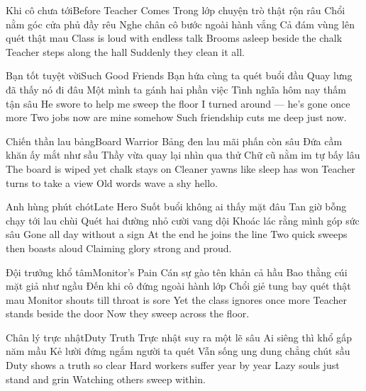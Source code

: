 \begin{tutuyetbox}{Khi cô chưa tới}{Before Teacher Comes}
Trong lớp chuyện trò thật rộn râu
Chổi nằm góc cửa phủ đầy rêu
Nghe chân cô bước ngoài hành vắng
Cả đám vùng lên quét thật mau
\tcblower
Class is loud with endless talk
Brooms asleep beside the chalk
Teacher steps along the hall
Suddenly they clean it all.
\end{tutuyetbox}

\begin{tutuyetbox}{Bạn tốt tuyệt vời}{Such Good Friends}
Bạn hứa cùng ta quét buổi đầu
Quay lưng đã thấy nó đi đâu
Một mình ta gánh hai phần việc
Tình nghĩa hôm nay thấm tận sâu
\tcblower
He swore to help me sweep the floor
I turned around — he’s gone once more
Two jobs now are mine somehow
Such friendship cuts me deep just now.
\end{tutuyetbox}

\begin{tutuyetbox}{Chiến thần lau bảng}{Board Warrior}
Bảng đen lau mãi phấn còn sâu
Đứa cầm khăn ấy mắt như sầu
Thầy vừa quay lại nhìn qua thử
Chữ cũ nằm im tự bấy lâu
\tcblower
The board is wiped yet chalk stays on
Cleaner yawns like sleep has won
Teacher turns to take a view
Old words wave a shy hello.
\end{tutuyetbox}

\begin{tutuyetbox}{Anh hùng phút chót}{Late Hero}
Suốt buổi không ai thấy mặt đâu
Tan giờ bỗng chạy tới lau chùi
Quét hai đường nhỏ cười vang dội
Khoác lác rằng mình góp sức sâu
\tcblower
Gone all day without a sign
At the end he joins the line
Two quick sweeps then boasts aloud
Claiming glory strong and proud.
\end{tutuyetbox}

\begin{tutuyetbox}{Đội trưởng khổ tâm}{Monitor's Pain}
Cán sự gào tên khản cả hầu
Bao thằng cúi mặt giả như ngầu
Đến khi cô đứng ngoài hành lớp
Chổi giẻ tung bay quét thật mau
\tcblower
Monitor shouts till throat is sore
Yet the class ignores once more
Teacher stands beside the door
Now they sweep across the floor.
\end{tutuyetbox}

\begin{tutuyetbox}{Chân lý trực nhật}{Duty Truth}
Trực nhật suy ra một lẽ sâu
Ai siêng thì khổ gấp năm mầu
Kẻ lười đứng ngắm người ta quét
Vẫn sống ung dung chẳng chút sầu
\tcblower
Duty shows a truth so clear
Hard workers suffer year by year
Lazy souls just stand and grin
Watching others sweep within.
\end{tutuyetbox}

